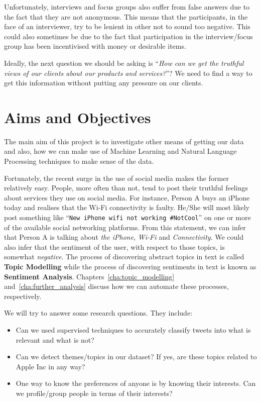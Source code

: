 Unfortunately, interviews and focus groups also suffer from false answers due to the fact that they
are not anonymous. This means that the participants, in the face of an interviewer, try to be
lenient in other not to sound too negative. This could also sometimes be due to the fact that
participation in the interview/focus group has been incentivised with money or desirable items.

Ideally, the next question we should be asking is ``\textit{How can we get the truthful views of our
clients about our products and services?}''? We need to find a way to get this information without
putting any pressure on our clients.

\section{Aims and Objectives}
\label{sec:objectives}
The main aim of this project is to investigate other means of getting our data and also, how we can
make use of Machine Learning and Natural Language Processing techniques to make sense of the data.

Fortunately, the recent surge in the use of social media makes the former relatively easy. People,
more often than not, tend to post their truthful feelings about services they use on social media.
For instance, Person A buys an iPhone today and realises that the Wi-Fi connectivity is faulty.
He/She will most likely post something like ``\texttt{New iPhone wifi not working \#NotCool}'' on
one or more of the available social networking platforms. From this statement, we can infer that
Person A is talking about \textit{the iPhone}, \textit{Wi-Fi} and \textit{Connectivity}. We could
also infer that the sentiment of the user, with respect to those topics, is somewhat
\textit{negative}. The process of discovering abstract topics in text is called \textbf{Topic
Modelling} while the process of discovering sentiments in text is known as \textbf{Sentiment
Analysis}. Chapters~\ref{cha:topic_modelling} and~\ref{cha:further_analysis} discuss how we can
automate these processes, respectively.

We will try to answer some research questions. They include:
\begin{itemize}
  \item Can we used supervised techniques to accurately classify tweets into what is relevant and
    what is not?
  \item Can we detect themes/topics in our dataset? If yes, are these topics related to Apple Inc in
    any way?
  \item One way to know the preferences of anyone is by knowing their interests. Can we
    profile/group people in terms of their interests?
\end{itemize}


